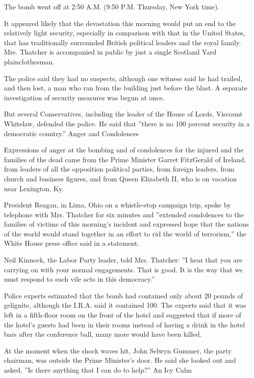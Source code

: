 The bomb went off at 2:50 A.M. (9:50 P.M. Thursday, New York time).

It appeared likely that the devastation this morning would put an end to
the relatively light security, especially in comparison with that in the
United States, that has traditionally surrounded British political
leaders and the royal family. Mrs. Thatcher is accompanied in public by
just a single Scotland Yard plainclothesman.

The police said they had no suspects, although one witness said he had
trailed, and then lost, a man who ran from the building just before the
blast. A separate investigation of security measures was begun at once.

But several Conservatives, including the leader of the House of Lords,
Viscount Whitelaw, defended the police. He said that ''there is no 100
percent security in a democratic country.'' Anger and Condolences

Expressions of anger at the bombing and of condolences for the injured
and the families of the dead came from the Prime Minister Garret
FitzGerald of Ireland, from leaders of all the opposition political
parties, from foreign leaders, from church and business figures, and
from Queen Elizabeth II, who is on vacation near Lexington, Ky.

President Reagan, in Lima, Ohio on a whistle-stop campaign trip, spoke
by telephone with Mrs. Thatcher for six minutes and ''extended
condolences to the families of victims of this morning's incident and
expressed hope that the nations of the world would stand together in an
effort to rid the world of terrorism,'' the White House press office
said in a statement.

Neil Kinnock, the Labor Party leader, told Mrs. Thatcher: ''I hear that
you are carrying on with your normal engagements. That is good. It is
the way that we must respond to such vile acts in this democracy.''

Police experts estimated that the bomb had contained only about 20
pounds of gelignite, although the I.R.A. said it contained 100. The
experts said that it was left in a fifth-floor room on the front of the
hotel and suggested that if more of the hotel's guests had been in their
rooms instead of having a drink in the hotel bars after the conference
ball, many more would have been killed.

At the moment when the shock waves hit, John Selwyn Gummer, the party
chairman, was outside the Prime Minister's door. He said she looked out
and asked, ''Is there anything that I can do to help?'' An Icy Calm

